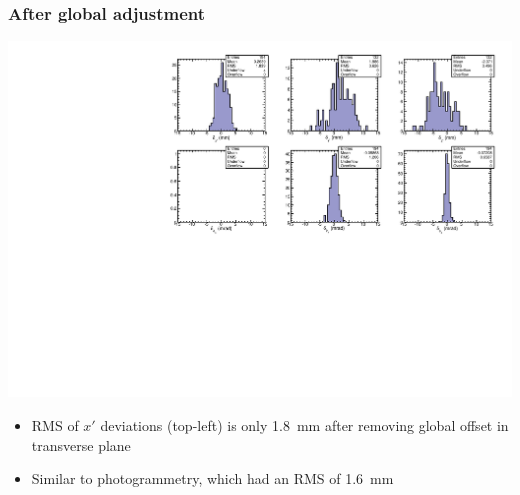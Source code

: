 \documentclass[compress]{beamer}
\begin{document}
\begin{frame}
\frametitle{After global adjustment}

\includegraphics[width=\linewidth]{NovHardware_vs_tracks_as_histograms.pdf}

\begin{itemize}
\item RMS of $x'$ deviations (top-left) is only 1.8~mm after removing global offset in transverse plane

\item Similar to photogrammetry, which had an RMS of 1.6~mm
\end{itemize}
\end{frame}
\end{document}
